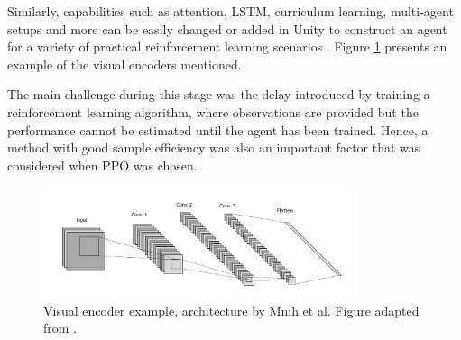 Similarly, capabilities such as attention, LSTM, curriculum learning, multi-agent setups and more can be easily changed or added in Unity to construct an agent for a variety of practical reinforcement learning scenarios \cite{github-unity-mlagents-toolkit}. Figure \ref{fig:unity-simple-encoder} presents an example of the visual encoders mentioned.

The main challenge during this stage was the delay introduced by training a reinforcement learning algorithm, where observations are provided but the performance cannot be estimated until the agent has been trained. Hence, a method with good sample efficiency was also an important factor that was considered when PPO was chosen.


\begin{figure}[!ht]
        \centering
        \includegraphics[width=0.8\textwidth]{images/simple_encoder.png}
        \caption{Visual encoder example, architecture by Mnih et al. Figure adapted from \cite{mnih2016asynchronous, github-unity-mlagents-toolkit}.
        }
        \label{fig:unity-simple-encoder}
\end{figure}






